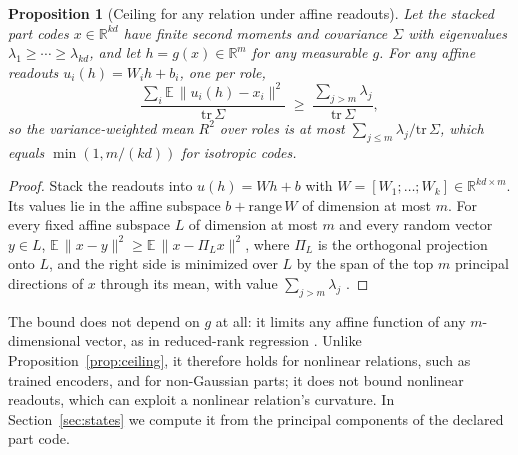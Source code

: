 \documentclass[10pt]{article}
\theoremstyle{plain}
\newtheorem{proposition}{Proposition}
\theoremstyle{remark}
\newcommand{\R}{\mathbb{R}}
\begin{document}
\begin{proposition}[Ceiling for any relation under affine readouts]
\label{prop:ey}
Let the stacked part codes $x \in \R^{kd}$ have finite second moments and covariance $\Sigma$ with eigenvalues $\lambda_1 \ge \cdots \ge \lambda_{kd}$, and let $h = g(x) \in \R^m$ for any measurable $g$. For any affine readouts $u_i(h) = W_i h + b_i$, one per role,
\begin{equation}
  \frac{\sum_i \mathbb{E}\,\lVert u_i(h) - x_i \rVert^2}{\mathrm{tr}\,\Sigma} \;\ge\; \frac{\sum_{j > m} \lambda_j}{\mathrm{tr}\,\Sigma},
\end{equation}
so the variance-weighted mean $R^2$ over roles is at most $\sum_{j \le m} \lambda_j / \mathrm{tr}\,\Sigma$, which equals $\min(1, m/(kd))$ for isotropic codes.
\end{proposition}

\begin{proof}
Stack the readouts into $u(h) = Wh + b$ with $W = [W_1; \ldots; W_k] \in \R^{kd \times m}$. Its values lie in the affine subspace $b + \mathrm{range}\,W$ of dimension at most $m$. For every fixed affine subspace $L$ of dimension at most $m$ and every random vector $y \in L$, $\mathbb{E}\,\lVert x - y \rVert^2 \ge \mathbb{E}\,\lVert x - \Pi_L x \rVert^2$, where $\Pi_L$ is the orthogonal projection onto $L$, and the right side is minimized over $L$ by the span of the top $m$ principal directions of $x$ through its mean, with value $\sum_{j > m} \lambda_j$ \citep{eckart1936}.
\end{proof}

\noindent
The bound does not depend on $g$ at all: it limits any affine function of any $m$-dimensional vector, as in reduced-rank regression \citep{izenman1975}. Unlike Proposition~\ref{prop:ceiling}, it therefore holds for nonlinear relations, such as trained encoders, and for non-Gaussian parts; it does not bound nonlinear readouts, which can exploit a nonlinear relation's curvature. In Section~\ref{sec:states} we compute it from the principal components of the declared part code.
\end{document}
